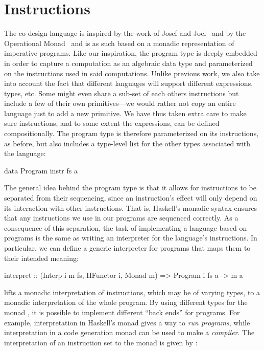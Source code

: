 \documentclass[../paper.tex]{subfiles}
\begin{document}
\section{Instructions}
\label{instr}

The co-design language is inspired by the work of Josef and Joel~\cite{BjornBenny} and by the Operational Monad~\cite{Operational} and is as such based on a monadic representation of imperative programs. Like our inspiration, the program type is deeply embedded in order to capture a computation as an algebraic data type and parameterized on the instructions used in said computations. Unlike previous work, we also take into account the fact that different languages will support different expressions, types, etc. Some might even share a sub-set of each others instructions but include a few of their own primitives---we would rather not copy an entire language just to add a new primitive. We have thus taken extra care to make sure instructions, and to some extent the expressions, can be defined compositionally. The program type is therefore parameterized on its instructions, as before, but also includes a type-level list for the other types associated with the language:

\begin{code}
data Program instr fs a
\end{code}

The general idea behind the program type is that it allows for instructions to be separated from their sequencing, since an instruction's effect will only depend on its interaction with other instructions. That is, Haskell's monadic syntax ensures that any instructions we use in our programs are sequenced correctly. As a consequence of this separation, the task of implementing a language based on programs is the same as writing an interpreter for the language's instructions. In particular, we can define a generic interpreter for programs that maps them to their intended meaning:

\begin{code}
interpret :: (Interp i m fs, HFunctor i, Monad m) => Program i fs a -> m a
\end{code}

 lifts a monadic interpretation of instructions, which may be of varying types, to a monadic interpretation of the whole program. By using different types for the monad , it is possible to implement different ``back ends'' for programs. For example, interpretation in Haskell's  monad gives a way to \emph{run programs}, while interpretation in a code generation monad can be used to make a \emph{compiler}. The interpretation of an instruction set  to the monad  is given by :
\end{document}
